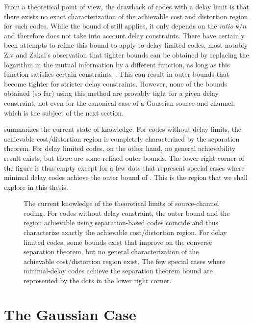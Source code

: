 From a theoretical point of view, the drawback of codes with a delay limit is
that there exists no exact characterization of the achievable cost and
distortion region for such codes. While the bound of 
still applies, it only depends on the \emph{ratio} $k/n$ and therefore does not
take into account delay constraints. There have certainly been attempts to
refine this bound to apply to delay limited codes, most notably Ziv and Zakai's
observation that tighter bounds can be obtained by replacing the logarithm in
the mutual information by a different function, as long as this function
satisfies certain constraints~\cite{ZivZ1973}. This can result in outer bounds
that become tighter for stricter delay constraints. However, none of the bounds
obtained (so far) using this method are provably tight for a given delay
constraint, not even for the canonical case of a Gaussian source and channel,
which is the subject of the next section.

 summarizes the current state of knowledge. For codes
without delay limits, the achievable cost/distortion region is completely
characterized by the separation theorem. For delay limited
codes, on the other hand, no general achievability result exists, but there are
some refined outer bounds. The lower right corner of the figure is thus empty
except for a few dots that represent special cases where minimal delay codes
achieve the outer bound of . This is the region that
we shall explore in this thesis. 

\begin{figure}
  \begin{center}
    
  \end{center}
  \caption{The current knowledge of the theoretical limits of source-channel
  coding. For codes without delay constraint, the outer bound and the
  region achievable using separation-based codes coincide and thus characterize
  exactly the achievable cost/distortion region. For delay limited codes, some
  bounds exist that improve on the converse separation theorem, but no general
  characterization of the achievable cost/distortion region exist. The few
  special cases where minimal-delay codes achieve the separation theorem bound
  are represented by the dots in the lower right corner.}
  \label{fig:achievableregions}
\end{figure}


\section{The Gaussian Case}\label{sec:gaussian}

